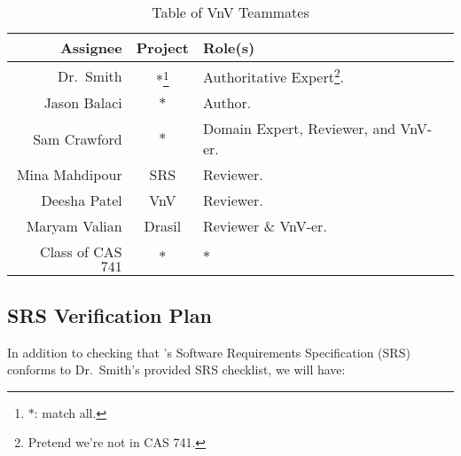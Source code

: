 \documentclass[12pt, titlepage]{article}
\begin{document}
\begin{longtable}{|r|c|l|}
    \caption{Table of VnV Teammates}
    \label{table:vnv_teammates}

    \\ \hline
    \rowcolor{Maroon}
    \textbf{Assignee}    & \textbf{Project}                  & \textbf{Role(s)}                                              \\ \hline
    \rowcolor{White}
    Dr.\ Smith           & \(*\)\footnote{\(*\): match all.} & Authoritative Expert\footnote{Pretend we're not in CAS 741.}. \\ \hline
    Jason Balaci         & \(*\)                             & Author.                                                       \\ \hline
    Sam Crawford         & \(*\)                             & Domain Expert, Reviewer, and VnV-er.                          \\ \hline
    Mina Mahdipour       & SRS                               & Reviewer.                                                     \\ \hline
    Deesha Patel         & VnV                               & Reviewer.                                                     \\ \hline
    Maryam Valian        & Drasil                            & Reviewer \& VnV-er.                                           \\ \hline
    Class of CAS \(741\) & \(*\)                             & \(*\)                                                         \\ \hline
\end{longtable}

\subsection{SRS Verification Plan}

In addition to checking that \progname{}'s Software Requirements Specification
(SRS) conforms to Dr.\ Smith's provided SRS checklist, we will have:
\end{document}
